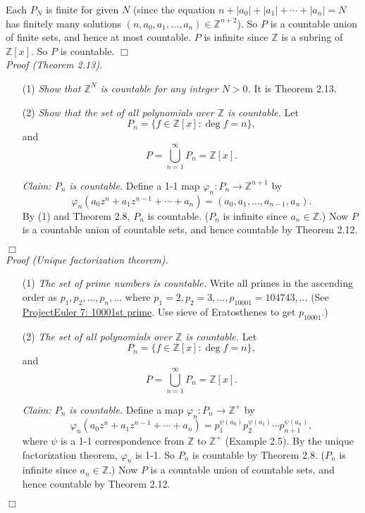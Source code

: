 \documentclass{article}
\begin{document}
Each $P_N$ is finite for given $N$
(since the equation $n + |a_0| + |a_1| + \cdots + |a_n| = N$
has finitely many solutions
$(n, a_0, a_1, \ldots, a_n) \in \mathbb{Z}^{n+2}$).
So $P$ is a countable union of finite sets, and hence at most countable.
$P$ is infinite since $\mathbb{Z}$ is a subring of $\mathbb{Z}[x]$.
So $P$ is countable.
$\Box$ \\

\emph{Proof (Theorem 2.13).}
\begin{enumerate}
\item[(1)]
\emph{Show that $\mathbb{Z}^N$ is countable for any integer $N > 0$.}
It is Theorem 2.13.
\item[(2)]
\emph{Show that the set of all polynomials over $\mathbb{Z}$ is countable.}
Let
$$P_n = \{ f \in \mathbb{Z}[x] : \deg f = n \},$$
and
$$P = \bigcup_{n = 1}^{\infty} P_n = \mathbb{Z}[x].$$

\emph{Claim: $P_n$ is countable.}
Define a 1-1 map $\varphi_n: P_n \rightarrow \mathbb{Z}^{n+1}$ by
$$\varphi_n(a_0 z^n + a_1 z^{n-1} + \cdots + a_n)
= (a_0, a_1, \ldots, a_{n-1}, a_n).$$
By (1) and Theorem 2.8, $P_n$ is countable.
($P_n$ is infinite since $a_n \in \mathbb{Z}$.)
Now $P$ is a countable union of countable sets,
and hence countable by Theorem 2.12.
\end{enumerate}
$\Box$ \\

\emph{Proof (Unique factorization theorem).}
\begin{enumerate}
\item[(1)]
\emph{The set of prime numbers is countable.}
Write all primes in the ascending order as $p_1, p_2, \ldots, p_n, \ldots$
where $p_1 = 2, p_2 = 3, \ldots, p_{10001} = 104743, \ldots$
(See \href{https://projecteuler.net/problem=7}{ProjectEuler 7: 10001st prime}.
Use sieve of Eratosthenes to get $p_{10001}$.)
\item[(2)]
\emph{The set of all polynomials over $\mathbb{Z}$ is countable.}
Let
$$P_n = \{ f \in \mathbb{Z}[x] : \deg f = n \},$$
and
$$P = \bigcup_{n = 1}^{\infty} P_n = \mathbb{Z}[x].$$

\emph{Claim: $P_n$ is countable.}
Define a map $\varphi_n: P_n \rightarrow \mathbb{Z}^+$ by
$$\varphi_n(a_0 z^n + a_1 z^{n-1} + \cdots + a_n)
= p_1^{\psi(a_0)} p_2^{\psi(a_1)} \cdots p_{n+1}^{\psi(a_n)},$$
where $\psi$ is a 1-1 correspondence from $\mathbb{Z}$ to $\mathbb{Z}^+$ (Example 2.5).
By the unique factorization theorem, $\varphi_n$ is 1-1.
So $P_n$ is countable by Theorem 2.8.
($P_n$ is infinite since $a_n \in \mathbb{Z}$.)
Now $P$ is a countable union of countable sets,
and hence countable by Theorem 2.12.
\end{enumerate}
$\Box$ \\\\
\end{document}
